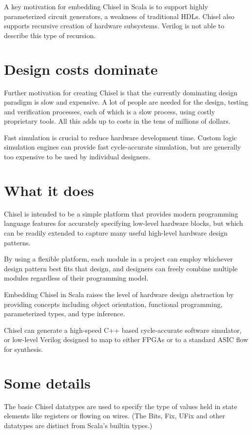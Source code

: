 \documentclass[a4paper,11pt]{article}
\begin{document}
A key motivation for embedding Chisel in Scala is to support highly parameterized circuit generators, a weakness of traditional HDLs. Chisel also supports recursive creation of hardware subsystems. Verilog is not able to describe this type of recursion.

\section{Design costs dominate}

Further motivation for creating Chisel is that the currently dominating design paradigm is slow and expensive. A lot of people are needed for the design, testing and verification processes, each of which is a slow process, using costly proprietary tools. All this adds up to costs in the tens of millions of dollars.

Fast simulation is crucial to reduce hardware development time. Custom logic simulation engines can provide fast cycle-accurate simulation, but are generally too expensive to be used by individual designers.

\section{What it does}

Chisel is intended to be a simple platform that provides modern programming language features for accurately specifying low-level hardware blocks, but which can be readily extended to capture many useful high-level hardware design patterns.

By using a flexible platform, each module in a project can employ whichever design pattern best fits that design, and designers can freely combine multiple modules regardless of their programming model.

Embedding Chisel in Scala raises the level of hardware design abstraction by providing concepts including object orientation, functional programming, parameterized types, and type inference.

Chisel can generate a high-speed C++ based cycle-accurate software simulator, or low-level Verilog designed to map to either FPGAs or to a standard ASIC flow for synthesis.

\section{Some details}

The basic Chisel datatypes are used to specify the type of values held in state elements like registers or flowing on wires. (The Bits, Fix, UFix and other datatypes are distinct from Scala's builtin types.)
\end{document}
